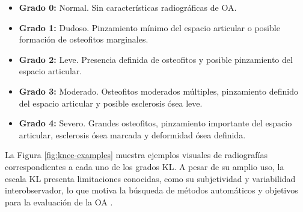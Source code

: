 \documentclass[11pt,spanish,listoffigures,listoftables]{tfgetsinf}
\begin{document}
\begin{itemize}
    \item \textbf{Grado 0:} Normal. Sin características radiográficas de OA.
    \item \textbf{Grado 1:} Dudoso. Pinzamiento mínimo del espacio articular o posible formación de osteofitos marginales.
    \item \textbf{Grado 2:} Leve. Presencia definida de osteofitos y posible pinzamiento del espacio articular.
    \item \textbf{Grado 3:} Moderado. Osteofitos moderados múltiples, pinzamiento definido del espacio articular y posible esclerosis ósea leve.
    \item \textbf{Grado 4:} Severo. Grandes osteofitos, pinzamiento importante del espacio articular, esclerosis ósea marcada y deformidad ósea definida.
\end{itemize}

La Figura \ref{fig:knee-examples} muestra ejemplos visuales de radiografías correspondientes a cada uno de los grados KL. A pesar de su amplio uso, la escala KL presenta 
limitaciones conocidas, como su subjetividad y variabilidad interobservador, lo que motiva la búsqueda de métodos automáticos y objetivos para la evaluación de la OA 
\cite{chen2019fully}.
\end{document}
